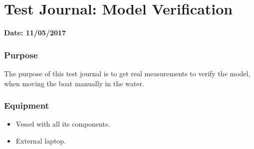 \chapter{Test Journal: Model Verification}\label{app:modelVerification}

\textbf{Date: 11/05/2017}

\subsection*{Purpose}
The purpose of this test journal is to get real measurements to verify the model, when moving the boat manually in the water.


\subsection*{Equipment}
\begin{itemize}
	\item Vessel with all its components.
	\item External laptop.
\end{itemize}

